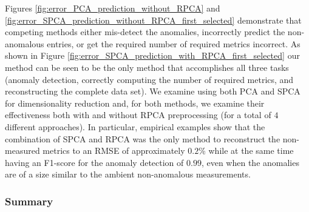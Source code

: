 \documentclass[conference]{IEEEtran}
\begin{document}

Figures \ref{fig:error_PCA_prediction_without_RPCA} and
\ref{fig:error_SPCA_prediction_without_RPCA_first_selected} demonstrate that competing methods either mis-detect the anomalies, incorrectly predict the non-anomalous entries, or get the required number of required metrics incorrect.
As shown in Figure \ref{fig:error_SPCA_prediction_with_RPCA_first_selected} our method can be seen to be the only method that accomplishes all three tasks (anomaly detection, correctly computing the number of required metrics, and reconstructing the complete data set).  We examine using both PCA and SPCA for dimensionality reduction and, for both methods, we examine their effectiveness both  with and without RPCA preprocessing (for a total of $4$ different approaches).
In particular, empirical examples show that the combination of SPCA and RPCA was the only method to reconstruct the non-measured metrics to an RMSE of approximately $0.2$\% while at the same time having an F1-score for the anomaly detection of $0.99$, even when the anomalies are of a size similar to the ambient non-anomalous measurements.  
\subsubsection {Summary}
\end{document}
